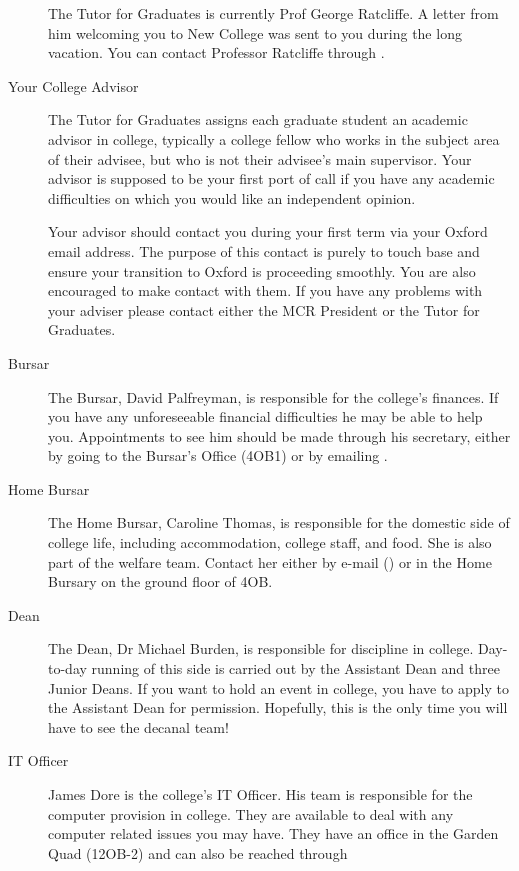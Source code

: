 \begin{description}
The Tutor for Graduates is currently Prof George Ratcliffe. A letter from him
welcoming you to New College was sent to you during the long vacation. You can
contact Professor Ratcliffe through 
\href{mailto:george.ratcliffe@new.ox.ac.uk}{}.

\item[Your College Advisor]
The Tutor for Graduates assigns each graduate student an academic advisor in college, typically a college fellow who works in the subject area of their advisee, but who is not their advisee's main supervisor. Your advisor is supposed to be your first port of call if you have any academic difficulties on which you would like an independent opinion.

Your advisor should contact you during your first term via your Oxford email address. The purpose of this contact is purely to touch base and ensure your transition to Oxford is proceeding smoothly. You are also encouraged to make contact with them. If you have any problems with your adviser please contact either the MCR President or the Tutor for Graduates.

\item[Bursar]
The Bursar, David Palfreyman, is responsible for the college's finances. If you have any unforeseeable financial difficulties he may be able to help you. Appointments to see him should be made through his secretary, either by going to the Bursar's Office (4OB1) or by emailing \href{mailto:bursar@new.ox.ac.uk}{}.

\item[Home Bursar]
The Home Bursar, Caroline Thomas, is responsible for the domestic side of college life, including accommodation, college staff, and food. She is also part of the welfare team. Contact her either by e-mail (\href{mailto:caroline.thomes@new.ox.ac.uk}{}) or in the Home Bursary on the ground floor of 4OB.

\item[Dean]
The Dean, Dr Michael Burden, is responsible for discipline in college. Day-to-day running of this side is carried out by the Assistant Dean and three Junior Deans. If you want to hold an event in college, you have to apply to the Assistant Dean for permission. Hopefully, this is the only time you will have to see the decanal team!

\item[IT Officer]
James Dore is the college's IT Officer. His team is responsible for the computer provision in college. They are available to deal with any computer related issues you may have. They have an office in the Garden Quad (12OB-2) and can also be reached through
\href{mailto:it-support@new.ox.ac.uk}{}


\end{description}
